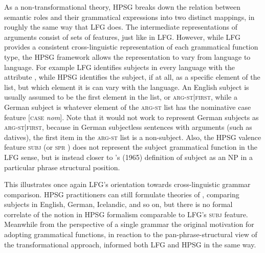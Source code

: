 As a non-transformational theory, HPSG breaks down the relation between semantic roles and their grammatical expressions into two distinct mappings, in roughly the same way that LFG does.  The intermediate representations of arguments consist of sets of features, just like in LFG.  However, while LFG provides a consistent cross-linguistic representation of each grammatical function type, the HPSG framework allows the representation to vary from language to language.  For example LFG identifies subjects in every language with the attribute , while HPSG identifies the subject, if at all, as a specific element of the  list, but which element it is can vary with the language.  An English subject is usually assumed to be the first element in the list, or \textsc{arg-st|first}, while a German subject is whatever element of the \textsc{arg-st} list has the nominative case feature [\textsc{case} \textit{nom}].   Note that it would not work to represent German subjects as \textsc{arg-st|first}, because in German  subjectless sentences with arguments (such as datives),  the first item in the \textsc{arg-st} list is a non-subject.  Also, the HPSG valence feature \textsc{subj} (or \textsc{spr} ) 
does not represent the subject grammatical function in the LFG sense, but is instead closer to \citeauthor{Chomsky65}'s (1965) %
definition of subject as an NP in a particular phrase structural position. 

This illustrates once again LFG's orientation towards cross-linguistic grammar comparison.  HPSG practitioners can still formulate theories of , comparing subjects in English, German, Icelandic, and so on, but there is no formal correlate of the notion  in HPSG formalism comparable to LFG's \textsc{subj} feature.  Meanwhile from the perspective of a single grammar the original motivation for adopting grammatical functions, in reaction to the pan-phrase-structural view of the transformational approach, informed both LFG and HPSG in the same way.  


